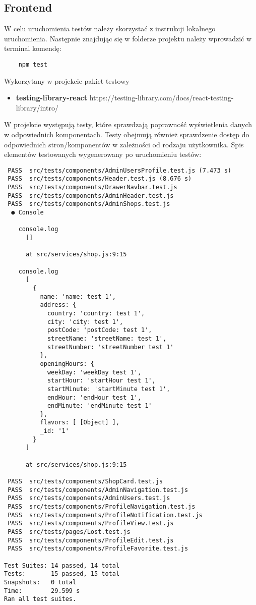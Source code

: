 \documentclass{article}
\begin{document}
        \subsection{Frontend}
        W celu uruchomienia testów należy skorzystać z instrukcji lokalnego uruchomienia. Następnie znajdując się w folderze projektu należy wprowadzić w terminal komendę: 
        \begin{lstlisting}
    npm test
        \end{lstlisting}
        Wykorzytany w projekcie pakiet testowy 
        \begin{itemize}
            \item \textbf{testing-library-react} https://testing-library.com/docs/react-testing-library/intro/
        \end{itemize}
        W projekcie występują testy, które sprawdzają poprawność wyświetlenia danych w odpowiednich komponentach. Testy obejmują również sprawdzenie dostęp do odpowiednich stron/komponentów w zależności od rodzaju użytkownika.
        Spis elementów testowanych wygenerowany po uruchomieniu testów:
        \begin{lstlisting}
 PASS  src/tests/components/AdminUsersProfile.test.js (7.473 s)
 PASS  src/tests/components/Header.test.js (8.676 s)
 PASS  src/tests/components/DrawerNavbar.test.js
 PASS  src/tests/components/AdminHeader.test.js
 PASS  src/tests/components/AdminShops.test.js
  ● Console

    console.log
      []

      at src/services/shop.js:9:15

    console.log
      [
        {
          name: 'name: test 1',
          address: {
            country: 'country: test 1',
            city: 'city: test 1',
            postCode: 'postCode: test 1',
            streetName: 'streetName: test 1',
            streetNumber: 'streetNumber test 1'
          },
          openingHours: {
            weekDay: 'weekDay test 1',
            startHour: 'startHour test 1',
            startMinute: 'startMinute test 1',
            endHour: 'endHour test 1',
            endMinute: 'endMinute test 1'
          },
          flavors: [ [Object] ],
          _id: '1'
        }
      ]

      at src/services/shop.js:9:15

 PASS  src/tests/components/ShopCard.test.js
 PASS  src/tests/components/AdminNavigation.test.js
 PASS  src/tests/components/AdminUsers.test.js
 PASS  src/tests/components/ProfileNavigation.test.js
 PASS  src/tests/components/ProfileNotification.test.js
 PASS  src/tests/components/ProfileView.test.js
 PASS  src/tests/pages/Lost.test.js
 PASS  src/tests/components/ProfileEdit.test.js
 PASS  src/tests/components/ProfileFavorite.test.js

Test Suites: 14 passed, 14 total
Tests:       15 passed, 15 total
Snapshots:   0 total
Time:        29.599 s
Ran all test suites.
\end{lstlisting}
\end{document}
